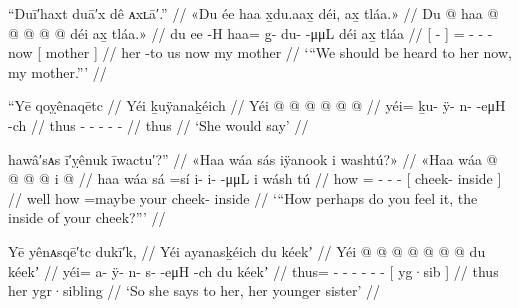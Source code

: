 

\ex\label{ex:92-50-should-be-heard-to-her}%
%
\begingl
	\glpreamble	“Duī′haxt duā′x dê ᴀxʟā′.” //
	\glpreamble	«\!Du ée haa x̱du.aax̱ déi, ax̱ tláa.\!» //
	\gla	{} Du  @ {} {}
		haa @  @ {} @ {} @ {} @ {}
		déi
		{} ax̱ tláa.\!» {} //
	\glb	{} du ee -H {}
		haa= {} g̱- du-  -μμL
		déi
		{} ax̱ tláa {} //
	\glc	{}[   - {}]
		= \· - -  -
		now
		{}[  mother {}] //
	\gld	{} her {} -to {}
		us  {} {} {} {}
		now
		{} my mother {} //
	\glft	‘“We should be heard to her now, my mother.”’
		//
\endgl
\xe


\ex\label{ex:92-51-she-said}%
%
\begingl
	\glpreamble	“Yē qoỵênaqētc //
	\glpreamble	Yéi ḵuÿanaḵéich //
	\gla	Yéi @  @ {} @ {} @ {} @ {} @ {} //
	\glb	yéi= ḵu- ÿ- n-  -eμH -ch //
	\glc	thus - - -  - - //
	\gld	thus  {} {} {} {} {} //
	\glft	‘She would say’
		//
\endgl
\xe

\ex\label{ex:92-52-how-does-it-feel-cheek-inside}%
%
\begingl
	\glpreamble	hawâ′sᴀs ī′ỵênuk īwactu′?” //
	\glpreamble	«\!Haa wáa sás iÿanook i washtú?\!» //
	\gla	«\!Haa wáa  @ {}
			 @ {} @ {} @ {}
			{} i  @ {} {} //
	\glb	\pqp{}haa wáa sá =sí
			i- i-  -μμL
			{} i wásh tú {} {} //
	\glc	\pqp{} how  =
			- -  -
			{}[  cheek- inside {}] //
	\gld	\pqp{}well how  =maybe
			 {} {} {}
			{} your cheek- inside {} //
	\glft	‘“How perhaps do you feel it, the inside of your cheek?”’
		//
\endgl
\xe


\ex\label{ex:92-53-she-says-to-her}%
%
\begingl
	\glpreamble	Yē yênᴀsqē′tc dukī′k, //
	\glpreamble	Yéi ayanasḵéich du kéekʼ //
	\gla	Yéi @  @ {} @ {} @ {} @ {} @ {} @ {}
		{} du kéekʼ {} //
	\glb	yéi= a- ÿ- n- s-  -eμH -ch
		{} du kéekʼ {} //
	\glc	thus= - - - -  - -
		{}[  yg·sib {}] //
	\gld	thus  {} {} {} {} {} {}
		{} her ygr·sibling {} //
	\glft	‘So she says to her, her younger sister’
		//
\endgl
\xe

